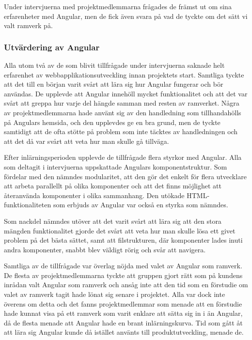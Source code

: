 Under intervjuerna med projektmedlemmarna frågades de främst ut om sina erfarenheter med Angular, men de fick även svara på vad de tyckte om det sätt vi valt ramverk på. 

\subsubsection{Utvärdering av Angular}

Alla utom två av de som blivit tillfrågade under intervjuerna saknade helt erfarenhet av webbapplikationsutveckling innan projektets start. Samtliga tyckte att det till en början varit svårt att lära sig hur Angular fungerar och bör användas. De upplevde att Angular innehöll mycket funktionalitet och att det var svårt att greppa hur varje del hängde samman med resten av ramverket. Några av projektmedlemmarna hade använt sig av den handledning som tillhandahölls på Angulars hemsida, och den upplevdes ge en bra grund, men de tyckte samtidigt att de ofta stötte på problem som inte täcktes av handledningen och att det då var svårt att veta hur man skulle gå tillväga.

Efter inlärningsperioden upplevde de tillfrågade flera styrkor med Angular. Alla som deltagit i intervjuerna uppskattade Angulars komponentstruktur. Som fördelar med den nämndes modularitet, att den gör det enkelt för flera utvecklare att arbeta parallellt på olika komponenter och att det finns möjlighet att återanvända komponenter i olika sammanhang. Den utökade HTML-funktionaliteten som erbjuds av Angular var också en styrka som nämndes.

Som nackdel nämndes utöver att det varit svårt att lära sig att den stora mängden funktionalitet gjorde det svårt att veta hur man skulle lösa ett givet problem på det bästa sättet, samt att filstrukturen, där komponenter lades inuti andra komponenter, snabbt blev väldigt rörig och svår att navigera.

Samtliga av de tillfrågade var överlag nöjda med valet av Angular som ramverk. De flesta av projektmedlemmarna tyckte att gruppen gjort rätt som på kundens inrådan valt Angular som ramverk och ansåg inte att den tid som en förstudie om valet av ramverk tagit hade lönat sig senare i projektet. Alla var dock inte överens om detta och det fanns projektmedlemmar som menade att en förstudie hade kunnat visa på ett ramverk som varit enklare att sätta sig in i än Angular, då de flesta menade att Angular hade en brant inlärningskurva. Tid som gått åt att lära sig Angular kunde då istället använts till produktutveckling, menade de.   


